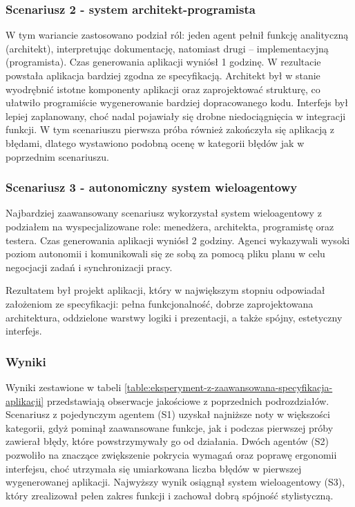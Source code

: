 \subsubsection*{Scenariusz 2 - system architekt-programista}
W tym wariancie zastosowano podział ról: jeden agent pełnił funkcję analityczną (architekt), interpretując dokumentację, natomiast drugi – implementacyjną (programista). Czas generowania aplikacji wyniósł 1 godzinę. W rezultacie powstała aplikacja bardziej zgodna ze specyfikacją. Architekt był w stanie wyodrębnić istotne komponenty aplikacji oraz zaprojektować strukturę, co ułatwiło programiście wygenerowanie bardziej dopracowanego kodu. Interfejs był lepiej zaplanowany, choć nadal pojawiały się drobne niedociągnięcia w integracji funkcji. W tym scenariuszu pierwsza próba również zakończyła się aplikacją z błędami, dlatego wystawiono podobną ocenę w kategorii błędów jak w poprzednim scenariuszu.

\subsubsection*{Scenariusz 3 - autonomiczny system wieloagentowy}
Najbardziej zaawansowany scenariusz wykorzystał system wieloagentowy z podziałem na wyspecjalizowane role: menedżera, architekta, programistę oraz testera. Czas generowania aplikacji wyniósł 2 godziny. Agenci wykazywali wysoki poziom autonomii i komunikowali się ze sobą za pomocą pliku planu w celu negocjacji zadań i synchronizacji pracy.

Rezultatem był projekt aplikacji, który w największym stopniu odpowiadał założeniom ze specyfikacji: pełna funkcjonalność, dobrze zaprojektowana architektura, oddzielone warstwy logiki i prezentacji, a także spójny, estetyczny interfejs.

\subsubsection*{Wyniki}
Wyniki zestawione w tabeli \ref{table:eksperyment-z-zaawansowana-specyfikacja-aplikacji} przedstawiają obserwacje jakościowe z poprzednich podrozdziałów. Scenariusz z pojedynczym agentem (S1) uzyskał najniższe noty w większości kategorii, gdyż pominął zaawansowane funkcje, jak i podczas pierwszej próby zawierał błędy, które powstrzymywały go od działania. Dwóch agentów (S2) pozwoliło na znaczące zwiększenie pokrycia wymagań oraz poprawę ergonomii interfejsu, choć utrzymała się umiarkowana liczba błędów w pierwszej wygenerowanej aplikacji. Najwyższy wynik osiągnął system wieloagentowy (S3), który zrealizował pełen zakres funkcji i zachował dobrą spójność stylistyczną.

